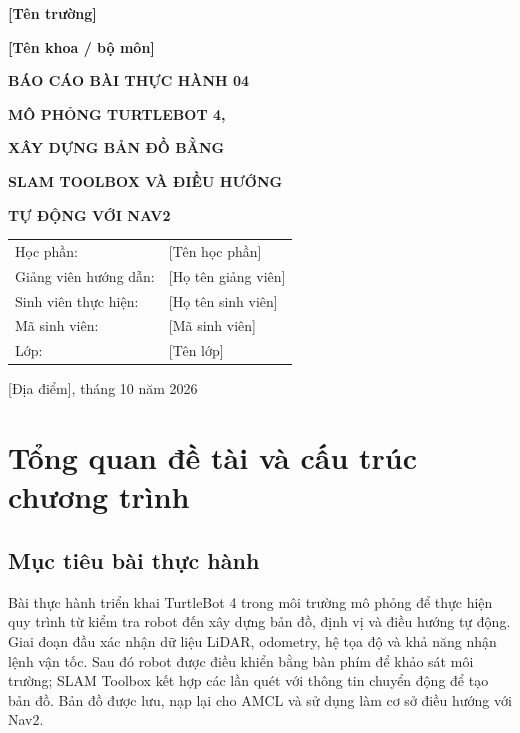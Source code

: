 \documentclass[12pt,a4paper]{article}
\newcommand{\tenTruong}{[Tên trường]}
\newcommand{\tenKhoa}{[Tên khoa / bộ môn]}
\newcommand{\tenHocPhan}{[Tên học phần]}
\newcommand{\tenGiangVien}{[Họ tên giảng viên]}
\newcommand{\tenSinhVien}{[Họ tên sinh viên]}
\newcommand{\maSinhVien}{[Mã sinh viên]}
\newcommand{\tenLop}{[Tên lớp]}
\newcommand{\diaDiem}{[Địa điểm]}
\begin{document}
\hypersetup{pageanchor=false}
\begin{titlepage}
\centering
{\large\bfseries \tenTruong\par}
\vspace{0.25cm}
{\large\bfseries \tenKhoa\par}
\vspace{1.5cm}
{\Large\bfseries BÁO CÁO BÀI THỰC HÀNH 04\par}
\vspace{0.9cm}
{\LARGE\bfseries MÔ PHỎNG TURTLEBOT 4,\par}
\vspace{0.2cm}
{\LARGE\bfseries XÂY DỰNG BẢN ĐỒ BẰNG\par}
{\LARGE\bfseries SLAM TOOLBOX VÀ ĐIỀU HƯỚNG\par}
{\LARGE\bfseries TỰ ĐỘNG VỚI NAV2\par}
\vspace{1.5cm}
\begin{tabular}{ll}
Học phần: & \tenHocPhan \\
Giảng viên hướng dẫn: & \tenGiangVien \\
Sinh viên thực hiện: & \tenSinhVien \\
Mã sinh viên: & \maSinhVien \\
Lớp: & \tenLop \\
\end{tabular}
\vfill
{\large \diaDiem, tháng 10 năm 2026\par}
\end{titlepage}

\hypersetup{pageanchor=true}
\tableofcontents
\newpage

\section{Tổng quan đề tài và cấu trúc chương trình}
\subsection{Mục tiêu bài thực hành}
Bài thực hành triển khai TurtleBot 4 trong môi trường mô phỏng để thực hiện
quy trình từ kiểm tra robot đến xây dựng bản đồ, định vị và điều hướng tự động.
Giai đoạn đầu xác nhận dữ liệu LiDAR, odometry, hệ tọa độ và khả năng nhận lệnh
vận tốc. Sau đó robot được điều khiển bằng bàn phím để khảo sát môi trường;
SLAM Toolbox kết hợp các lần quét với thông tin chuyển động để tạo bản đồ.
Bản đồ được lưu, nạp lại cho AMCL và sử dụng làm cơ sở điều hướng với Nav2.
\end{document}

